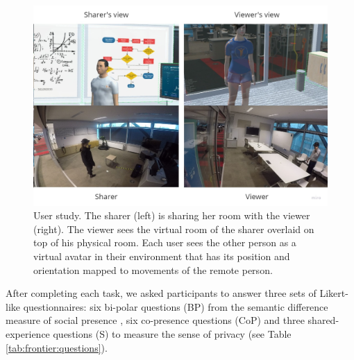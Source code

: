 \begin{figure}
    \begin{center}
    \includegraphics[width=\linewidth]{images/54-hiding-frontier18/user-study-setup.jpg}
    \caption{User study. The sharer (left) is sharing her room with the viewer (right). The viewer sees the virtual room of the sharer overlaid on top of his physical room. Each user sees the other person as a virtual avatar in their environment that has its position and orientation mapped to movements of the remote person.}
    \label{fig:frontier18:user-study}
    \end{center}
\end{figure}

After completing each task, we asked participants to answer three sets of Likert-like questionnaires: six bi-polar questions (BP) from the semantic difference measure of social presence \cite{Smith2018}, six co-presence questions (CoP) and three shared-experience questions (S) to measure the sense of privacy (see Table \ref{tab:frontier:questions}).  

